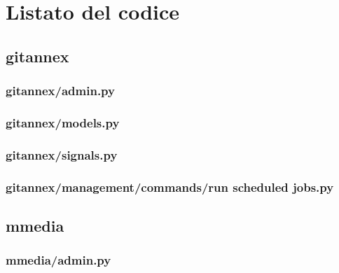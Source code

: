\chapter{Listato del codice}
\label{AppendiceA}

\section{gitannex}



\subsection{gitannex/admin.py}


\subsection{gitannex/models.py}


\subsection{gitannex/signals.py}


\subsection{gitannex/management/commands/run scheduled jobs.py}



\section{mmedia}



\subsection{mmedia/admin.py}


